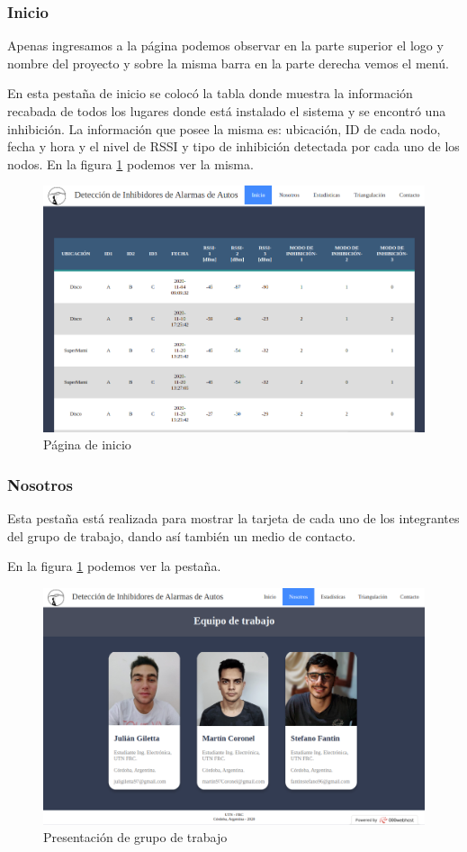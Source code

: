 \subsubsection{Inicio}
Apenas ingresamos a la página podemos observar en la parte superior el logo y nombre del proyecto y sobre la misma barra en la parte derecha vemos el menú.
\par En esta pestaña de inicio se colocó la tabla donde muestra la información recabada de todos los lugares donde está instalado el sistema y se encontró 
una inhibición. La información que posee la misma es: ubicación, ID de cada nodo, fecha y hora y el nivel de RSSI y tipo de inhibición detectada por cada uno
 de los nodos. En la figura \ref{web_inicio} podemos ver la misma. 
\begin{figure}[h!]
	\centering
	\includegraphics[scale=0.32]{images/web/tabla-web.png}
    \caption{Página de inicio}
	\label{web_inicio}
\end{figure}
\subsubsection{Nosotros}
Esta pestaña está realizada para mostrar la tarjeta de cada uno de los integrantes del grupo de trabajo, dando así también un medio de contacto.
\par En la figura \ref{web_inicio} podemos ver la pestaña. 
\begin{figure}[h!]
	\centering
	\includegraphics[scale=0.3]{images/web/nosotros-web.png}
    \caption{Presentación de grupo de trabajo}
	\label{web_nos}
\end{figure}
